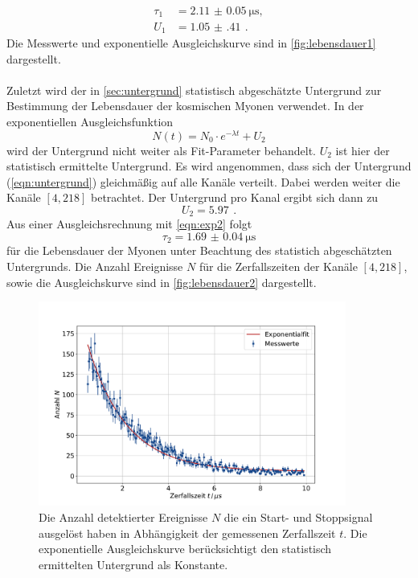 \begin{align}
    \tau_1 &= \qty{2.11(5)}{\micro\second},\\
    U_1 &= \qty{1.05(41)}{} \,.
\end{align}
Die Messwerte und exponentielle Ausgleichskurve sind in \autoref{fig:lebensdauer1} dargestellt.
\\
\\
Zuletzt wird der in \autoref{sec:untergrund} statistisch abgeschätzte Untergrund zur Bestimmung der Lebensdauer der kosmischen Myonen verwendet.
In der exponentiellen Ausgleichsfunktion
\begin{equation}
    N(t) = N_0 \cdot e^{- \lambda t} + U_2
    \label{eqn:exp2}
\end{equation}
wird der Untergrund nicht weiter als Fit-Parameter behandelt.
$U_2$ ist hier der statistisch ermittelte Untergrund.
Es wird angenommen, dass sich der Untergrund (\autoref{eqn:untergrund}) gleichmäßig auf alle Kanäle verteilt.
Dabei werden weiter die Kanäle $[4,218]$ betrachtet.
Der Untergrund pro Kanal ergibt sich dann zu
\begin{equation}
    U_2 = \qty{5.97}{} \, .
\end{equation}
Aus einer Ausgleichsrechnung mit \autoref{eqn:exp2} folgt
\begin{equation}
    \tau_2 = \qty{1.69(4)}{\micro\second}
\end{equation}
für die Lebensdauer der Myonen unter Beachtung des statistich abgeschätzten Untergrunds.
Die Anzahl Ereignisse $N$ für die Zerfallszeiten der Kanäle $[4,218]$, sowie die Ausgleichskurve sind in \autoref{fig:lebensdauer2} dargestellt.
\begin{figure}
    \centering
    \includegraphics[width=0.9\textwidth]{content/plots/lifetime2.pdf}
    \caption{Die Anzahl detektierter Ereignisse $N$ die ein Start- und Stoppsignal ausgelöst haben in Abhängigkeit der gemessenen Zerfallszeit $t$.
    Die exponentielle Ausgleichskurve berücksichtigt den statistisch ermittelten Untergrund als Konstante.
    }
    \label{fig:lebensdauer2}
\end{figure}